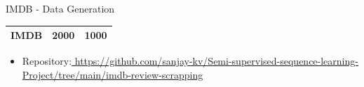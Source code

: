 \documentclass[aspectratio=169,xcolor=dvipsnames]{beamer}
\begin{document}
\begin{frame}{IMDB - Data Generation}
\begin{table}[h!]
\begin{center}
\begin{tabular}{l|c|r}
      \hline
      IMDB & 2000 & 1000 \\
      \hline
     
    \end{tabular}
  \end{center}
\end{table}   \newline
\begin{itemize}
      
    \item \alert{Repository:}\href{ https://github.com/sanjay-kv/Semi-supervised-sequence-learning-Project/tree/main/imdb_review_scrapping}{ https://github.com/sanjay-kv/Semi-supervised-sequence-learning-Project/tree/main/imdb-review-scrapping}
 
    \end{itemize}
\end{frame}


\end{document}
